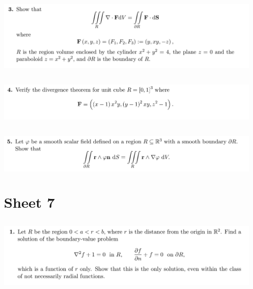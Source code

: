 \documentclass[12pt]{article}
\begin{document}
\subsection{}
\begin{mdframed}
  \includegraphics[width=400pt]{img/oxford-prelims-M5-multivariable-calc-6-3.png}
\end{mdframed}

\subsection{}
\begin{mdframed}
  \includegraphics[width=400pt]{img/oxford-prelims-M5-multivariable-calc-6-4.png}
\end{mdframed}

\subsection{}
\begin{mdframed}
  \includegraphics[width=400pt]{img/oxford-prelims-M5-multivariable-calc-6-5.png}
\end{mdframed}

\newpage
\section{Sheet 7}

\subsection{}
\begin{mdframed}
  \includegraphics[width=400pt]{img/oxford-prelims-M5-multivariable-calc-7-1.png}
\end{mdframed}
\end{document}
